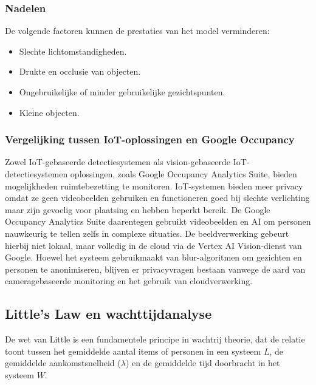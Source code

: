 \subsubsection{Nadelen} \autocite{Cloud2025}
De volgende factoren kunnen de prestaties van het model verminderen: 
\begin{itemize}
    \item Slechte lichtomstandigheden.
    \item Drukte en occlusie van objecten.
    \item Ongebruikelijke of minder gebruikelijke gezichtspunten.
    \item Kleine objecten.
\end{itemize}

\subsubsection{Vergelijking tussen IoT-oplossingen en Google Occupancy}
Zowel IoT-gebaseerde detectiesystemen als vision-gebaseerde IoT-detectiesystemen oplossingen, zoals Google Occupancy Analytics Suite, bieden mogelijkheden ruimtebezetting te monitoren. IoT-systemen bieden meer privacy omdat ze geen videobeelden gebruiken en functioneren goed bij slechte verlichting maar zijn gevoelig voor plaatsing en hebben beperkt bereik. De Google Occupancy Analytics Suite daarentegen gebruikt videobeelden en AI om personen nauwkeurig te tellen zelfs in complexe situaties. De beeldverwerking gebeurt hierbij niet lokaal, maar volledig in de cloud via de Vertex AI Vision-dienst van Google. Hoewel het systeem gebruikmaakt van blur-algoritmen om gezichten en personen te anonimiseren, blijven er privacyvragen bestaan vanwege de aard van cameragebaseerde monitoring en het gebruik van cloudverwerking.


\subsection{Little’s Law en wachttijdanalyse}
De wet van Little is een fundamentele principe in wachtrij theorie, dat de relatie toont tussen het gemiddelde aantal items of personen in een systeem \(L\), de gemiddelde aankomstsnelheid (\( \lambda \)) en de gemiddelde tijd doorbracht in het systeem \(W\). \autocite{Little2008, Wolff2011}

